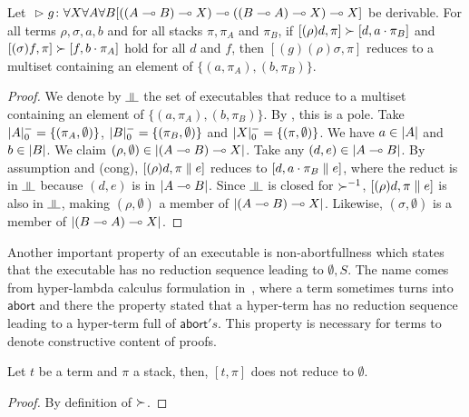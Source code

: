 \begin{proposition}
 \label{prop:spec}
 Let
 ${}\vartriangleright{}{ {g} \colon{\forall X\forall A\forall B
 [((A\multimap B)\multimap X)
  \multimap((B\multimap A)\multimap X)
  \multimap X]} }$
 be
 derivable.
 For all terms $\rho,\sigma, a,b$ and for all stacks $\pi, \pi_A$ and
 $\pi_B$,
 if $[(\rho)d  ,\pi]\succ [d,a\cdot \pi_B]$ and
    $[(\sigma)f,\pi]\succ [f,b\cdot \pi_A]$ hold for all $d$ and $f$,
 then
 $[(g)(\rho)\sigma,\pi]$ reduces to a multiset containing an
 element of
 $\{(a,\pi_A),(b,\pi_B)\}$.
\end{proposition}
\begin{proof}
 We denote by $\bbot$ the set of executables that reduce to a multiset
 containing an element of $\{(a,\pi_A), (b,\pi_B)\}$.
 By ,
 this is a pole.
 Take $|{A}|^-_0 =\{(\pi_A,\emptyset)\}$, $|{B}|^-_0 =
 \{(\pi_B,\emptyset)\}$ and $|{X}|^-_0=\{(\pi,\emptyset)\}$.
 We have $a\in|{A}|$ and $b\in|{B}|$.
 We claim $(\rho,\emptyset)\in|{(A\multimap B)\multimap X}|$.
 Take any $(d,e)\in|{A\multimap B}|$.
 By assumption and (cong),
 $[(\rho)d,\pi\parallel e]$ reduces to $[d,a\cdot\pi_B\parallel e]$,
 where the reduct is in $\bbot$ because $(d,e)$ is in $|{A\multimap B}|$.
 Since $\bbot$ is closed for ${\succ}^{-1}$,
 $[(\rho)d,\pi\parallel e]$ is also in $\bbot$, making
 $(\rho,\emptyset)$ a member of $|{(A\multimap B)\multimap X}|$.
 Likewise,
 $(\sigma,\emptyset)$ is a member of $|{(B\multimap A)\multimap X}|$.
\end{proof}


Another important property of an executable is
non-abortfullness
which states that the executable has no reduction sequence leading to
$\emptyset,S$.
The name comes from hyper-lambda calculus formulation in~\citep{hiraiflops2012},
where a term sometimes turns into $\mathsf{abort}$ and there the property
stated that a hyper-term has no reduction sequence leading to a hyper-term
full of $\mathsf{abort}'s$.
This property is necessary for terms to denote
constructive content of proofs.

\begin{proposition}
 Let $t$ be a term and $\pi$ a stack, then,
 $[t,\pi]$ does not reduce to $\emptyset$.
\end{proposition}
\begin{proof}
 By definition of $\succ$.
\end{proof}


